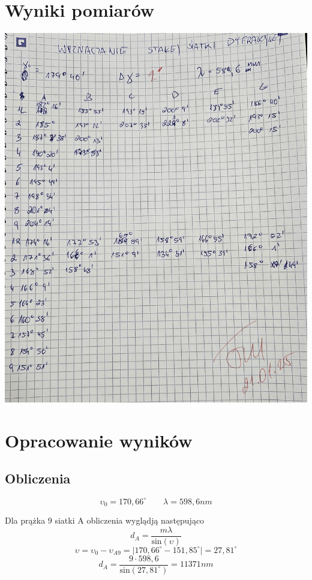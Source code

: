 \documentclass[a4paper, 11pt]{article}
\begin{document}

\section{Wyniki pomiarów}\label{sec:wyniki_pomiarow} %
\begin{center}
	\includegraphics[scale=0.2]{pictures/20250121_124928.jpg}
\end{center}

\section{Opracowanie wyników}\label{sec:opracowanie_wynikow} %

\subsection{Obliczenia}\label{sub:obliczenia} %
\[
	\upsilon_0 = 170,66^{\circ} \qquad \lambda = 598,6 nm
\]

Dla prążka 9 siatki A obliczenia wyglądją następująco
\[
	d_A = \frac{m\lambda}{\text{sin}(\upsilon)}
\]
\[
	\upsilon = \upsilon_0 - \upsilon_{A9} = \left| 170,66^{\circ} - 151,85^{\circ} \right| = 27,81^{\circ}
\]
\[
	d_A = \frac{9 \cdot 598,6}{\text{sin}(27,81^{\circ})} = 11371 nm
\]
\end{document}
